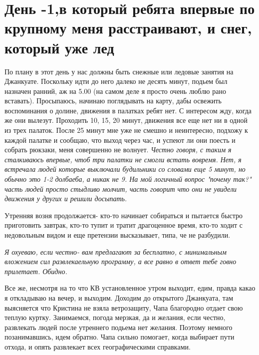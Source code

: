 \documentclass[]{article}
\begin{document}
\section{День -1,в который ребята впервые по крупному меня расстраивают, и  снег, который уже лед}



По плану в этот день у нас должны быть снежные или ледовые занятия на Джанкуате. Поскольку идти до него далеко не десять минут, подьем был назначен ранний, аж на 5.00 (на самом деле я просто очень люблю рано вставать). Просыпаюсь, начинаю поглядывать на карту, дабы освежить воспоминания о долине, движения в палатках ребят нет. С интересом жду, когда же они вылезут. Проходить 10, 15, 20 минут, движения все еще нет ни в одной из трех палаток. После 25 минут мне уже не смешно и неинтересно, подхожу к каждой палатке и сообщаю, что выход через час, и успеют ли они поесть и собрать рюкзаки,   меня совершенно не волнует. \textit{Честно говоря, с таким я сталкиваюсь впервые, чтоб три палатки не смогли встать вовремя. Нет, я встречала людей которые выключали будильники со словами еще 5 минут, но обычно это 1-2 долбаеба, а никак не 9. На мой логичный вопрос "почему так?" часть людей просто стыдливо молчит, часть говорит что они не увидели движения у других и решили досыпать.} 

Утренняя возня продолжается- кто-то начинает собираться и пытается быстро приготовить завтрак, кто-то тупит и тратит драгоценное время, кто-то ходит с недовольным видом и еще претензии высказывает, типа, че не разбудили.

\textit{Я охуеваю, если честно- вам предлагают за бесплатно, с минимальным вложением сил развлекаельную программу, а все равно в ответ тебе говно прилетает. Обидно.}  

Все же, несмотря на то что КВ установленное утром выходит, едим, правда какао я откладываю на вечер, и выходим. Доходим до открытого Джанкуата, там выясняется что Кристина не взяла ветрозащиту, Чапа благородно отдает свою теплую куртку. Занимаемся, погода мерзкая, да и желания, если честно, развлекать людей после утреннего подьема нет желания. Поэтому немного позанимавшись, идем обратно. Чапа сильно помогает, когда выбирает пути отхода, и опять развлекает всех географическими справками. 
\end{document}
